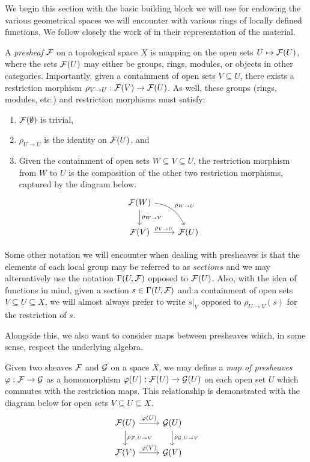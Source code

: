 We begin this section with the basic building block we will use for endowing the various geometrical spaces we will encounter with various rings of locally defined functions.
We follow closely the work of \cite{Hartshorne_2013} in their representation of the material.

\begin{definition}[Presheaf]
    A \textit{presheaf} $\mathcal{F}$ on a topological space $X$ is mapping on the open sets $U \mapsto \mathcal{F}(U)$, 
    where the sets $\mathcal{F}(U)$ may either be groups, rings, modules, or objects in other categories.
    Importantly, given a containment of open sets $V \subseteq U$, 
    there exists a restriction morphism $\rho_{V \to U}: \mathcal{F}(V) \to \mathcal{F}(U)$.
    As well, these groups (rings, modules, etc.) and restriction morphisms must satisfy:
    \begin{enumerate}
        \item $\mathcal{F}(\emptyset)$ is trivial,
        \item $\rho_{U \to U}$ is the identity on $\mathcal{F}(U)$, and
        \item  Given the containment of open sets $W \subseteq V \subseteq U$, the restriction morphism from $W$ to $U$ is the composition of the other two restriction morphisms, captured by the diagram below.
        \[
            \begin{tikzcd}
                \cF(W) \arrow[d, "\rho_{W \to V}"] \arrow[dr, "\rho_{W \to U}", bend left] \\
                \cF(V) \arrow[r, "\rho_{V \to U}"] & \cF(U)
            \end{tikzcd}
        \]
    \end{enumerate}
\end{definition}

Some other notation we will encounter when dealing with presheaves is that the elements of each local group may be referred to as $\textit{sections}$
and we may alternatively use the notation $\Gamma(U, \mathcal{F})$ opposed to $\mathcal{F}(U)$.
Also, with the idea of functions in mind, given a section $s \in \Gamma(U, \mathcal{F})$ and a containment of open sets $V \subseteq U \subseteq X$,
we will almost always prefer to write $s|_V$ opposed to $\rho_{U \to V}(s)$ for the restriction of $s$.

Alongside this, we also want to consider maps between presheaves which, in some sense, respect the underlying algebra.

\begin{definition}
    Given two sheaves $\mathcal{F}$ and $\mathcal{G}$ on a space $X$, 
    we may define a \textit{map of presheaves} $\varphi : \mathcal{F} \to \mathcal{G}$ as a homomorphism $\varphi(U) : \mathcal{F}(U) \to \mathcal{G}(U)$ on each open set $U$ which commutes with the restriction maps.
    This relationship is demonstrated with the diagram below for open sets $V \subseteq U \subseteq X$.
    \[
        \begin{tikzcd}
            \cF(U) \arrow[r, "\varphi(U)"] \arrow[d, "\rho_{\cF, U \to V}"] & \cG(U) \arrow[d, "\rho_{\cG, U \to V}"] \\
            \cF(V) \arrow[r, "\varphi(V)"] & \cG(V)
        \end{tikzcd}
    \]
\end{definition}

